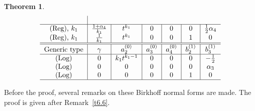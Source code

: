 \documentclass[10pt,a4paper]{amsart}
\numberwithin{equation}{section}
\numberwithin{figure}{section}
\newtheorem{Theorem}{Theorem}[section]
\begin{document}
\begin{Theorem}
\[\begin{tabular}{c|c|c|c|c|c|c}
\\
\hline
$($Reg$)$, $k_1$ & $\frac{1+\alpha_4}{k_1}$ & $t^{k_1}$ & $0$ &
$0$ & $0$ & $\frac{1}{2}\alpha_4$
\\
$($Reg$)$, $k_1$ & $\frac{1}{k_1}$ & $t^{k_1}$ & $0$ & $0$ & $1$ & $0$
\\ \hline \hline
Generic type & $\gamma$
& $a_2^{(0)}$ & $a_3^{(0)}$ & $a_4^{(0)}$ &
$b_2^{(1)}$ & $b_3^{(1)}$
\\ \hline
$($Log$)$ & $0$ & $k_1t^{k_1-1}$ & $0$ & $0$ & $0$ & $-\frac{1}{2}$
\\
$($Log$)$ & $0$ & $0$ & $0$ & $0$ & $0$ & $\alpha_3$
\\
$($Log$)$ & $0$ & $0$ & $0$ & $0$ & $1$ & $0$
\\
\hline
\end{tabular}
\]
\end{Theorem}

Before the proof, several remarks on these Birkhoff
normal forms are made.
The proof is given after Remark~\ref{t6.6}.
\end{document}
